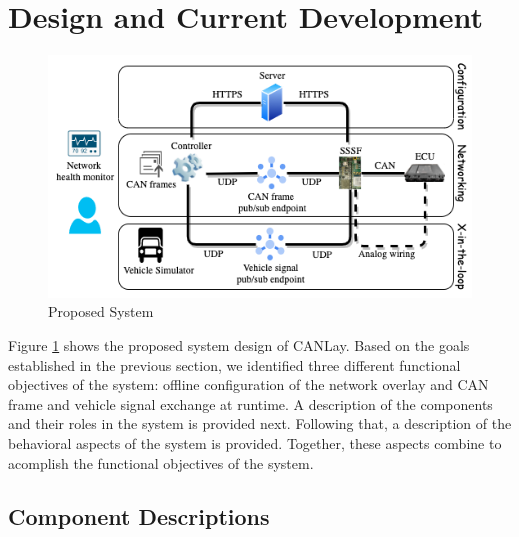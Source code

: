\documentclass[letterpaper,twocolumn,12pt]{article}
\begin{document}
\section{Design and Current Development}
\begin{figure}[t!]
    \centering
    \includegraphics[width=\linewidth]{images/system_design.drawio.png}
    \caption{Proposed System}
    \label{fig:system}
\end{figure}
Figure \ref{fig:system} shows the proposed system design of CANLay. Based on the goals established in the previous section, we identified three different functional objectives of the system: offline configuration of the network overlay and CAN frame and vehicle signal exchange at runtime. A description of the components and their roles in the system is provided next. Following that, a description of the behavioral aspects of the system is provided. Together, these aspects combine to acomplish the functional objectives of the system.



\subsection{Component Descriptions}
\end{document}
